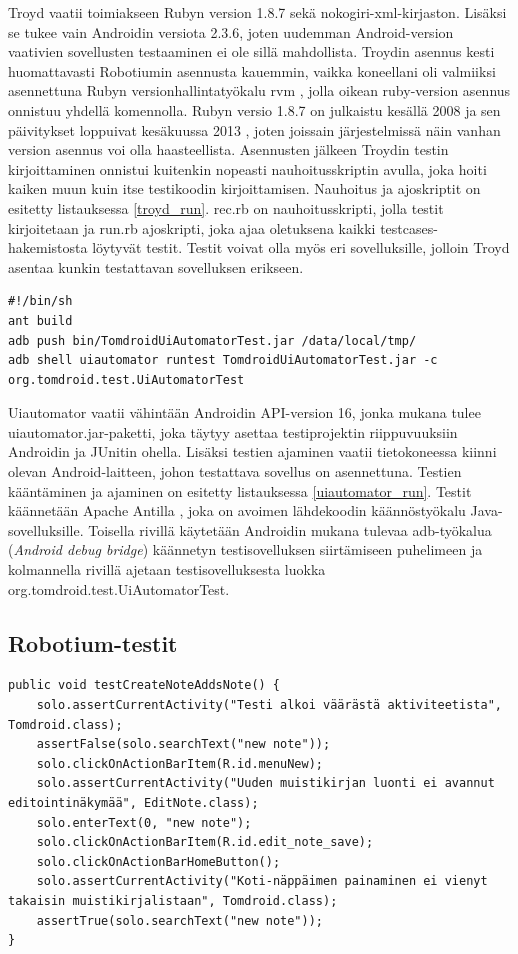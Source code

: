 Troyd vaatii toimiakseen Rubyn version 1.8.7 sekä nokogiri-xml-kirjaston. Lisäksi se tukee vain Androidin versiota 2.3.6, joten uudemman Android-version vaativien sovellusten testaaminen ei ole sillä mahdollista. Troydin asennus kesti huomattavasti Robotiumin asennusta kauemmin, vaikka koneellani oli valmiiksi asennettuna Rubyn versionhallintatyökalu rvm \cite{rvm}, jolla oikean ruby-version asennus onnistuu yhdellä komennolla. Rubyn versio 1.8.7 on julkaistu kesällä 2008 ja sen päivitykset loppuivat kesäkuussa 2013 \cite{ruby_187}, joten joissain järjestelmissä näin vanhan version asennus voi olla haasteellista. Asennusten jälkeen Troydin testin kirjoittaminen onnistui kuitenkin nopeasti nauhoitusskriptin avulla, joka hoiti kaiken muun kuin itse testikoodin kirjoittamisen. Nauhoitus ja ajoskriptit on esitetty listauksessa \ref{troyd_run}. rec.rb on nauhoitusskripti, jolla testit kirjoitetaan ja run.rb ajoskripti, joka ajaa oletuksena kaikki testcases-hakemistosta löytyvät testit. Testit voivat olla myös eri sovelluksille, jolloin Troyd asentaa kunkin testattavan sovelluksen erikseen.

\begin{lstlisting}[float, label=uiautomator_run,caption=Uiautomator-testien ajaminen]
#!/bin/sh
ant build
adb push bin/TomdroidUiAutomatorTest.jar /data/local/tmp/
adb shell uiautomator runtest TomdroidUiAutomatorTest.jar -c org.tomdroid.test.UiAutomatorTest
\end{lstlisting}

Uiautomator vaatii vähintään Androidin API-version 16, jonka mukana tulee uiautomator.jar-paketti, joka täytyy asettaa testiprojektin riippuvuuksiin Androidin ja JUnitin ohella. Lisäksi testien ajaminen vaatii tietokoneessa kiinni olevan Android-laitteen, johon testattava sovellus on asennettuna. Testien kääntäminen ja ajaminen on esitetty listauksessa \ref{uiautomator_run}. Testit käännetään Apache Antilla \cite{ant}, joka on avoimen lähdekoodin käännöstyökalu Java-sovelluksille. Toisella rivillä käytetään Androidin mukana tulevaa adb-työkalua (\emph{Android debug bridge}) käännetyn testisovelluksen siirtämiseen puhelimeen ja kolmannella rivillä ajetaan testisovelluksesta luokka org.tomdroid.test.UiAutomatorTest.

\subsection{Robotium-testit}

\begin{lstlisting}[float,label=robotium_createnote,caption=Muistikirjan luontitesti Robotiumilla]
public void testCreateNoteAddsNote() {
	solo.assertCurrentActivity("Testi alkoi väärästä aktiviteetista", Tomdroid.class);
	assertFalse(solo.searchText("new note"));
	solo.clickOnActionBarItem(R.id.menuNew);
	solo.assertCurrentActivity("Uuden muistikirjan luonti ei avannut editointinäkymää", EditNote.class);
	solo.enterText(0, "new note");
	solo.clickOnActionBarItem(R.id.edit_note_save);
	solo.clickOnActionBarHomeButton();
	solo.assertCurrentActivity("Koti-näppäimen painaminen ei vienyt takaisin muistikirjalistaan", Tomdroid.class);
	assertTrue(solo.searchText("new note"));
}
\end{lstlisting}

